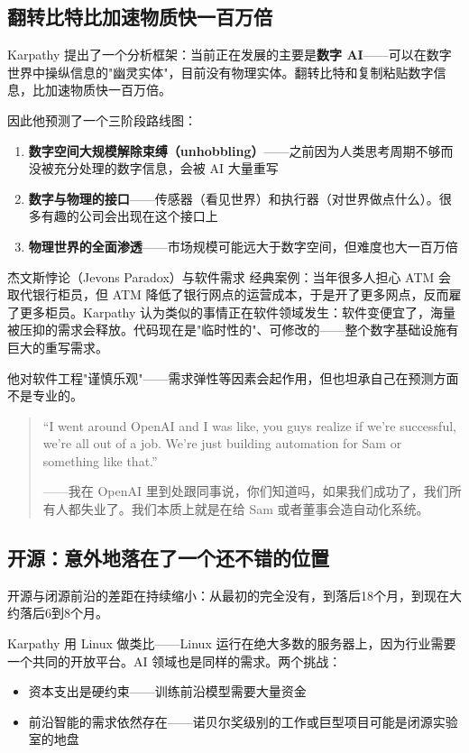 \documentclass[a4paper]{article}
\begin{document}
\subsection{翻转比特比加速物质快一百万倍}

Karpathy 提出了一个分析框架：当前正在发展的主要是\textbf{数字 AI}——可以在数字世界中操纵信息的"幽灵实体"，目前没有物理实体。翻转比特和复制粘贴数字信息，比加速物质快一百万倍。

因此他预测了一个三阶段路线图：
\begin{enumerate}
    \item \textbf{数字空间大规模解除束缚（unhobbling）}——之前因为人类思考周期不够而没被充分处理的数字信息，会被 AI 大量重写
    \item \textbf{数字与物理的接口}——传感器（看见世界）和执行器（对世界做点什么）。很多有趣的公司会出现在这个接口上
    \item \textbf{物理世界的全面渗透}——市场规模可能远大于数字空间，但难度也大一百万倍
\end{enumerate}

\begin{knowledgebox}{杰文斯悖论（Jevons Paradox）与软件需求}
经典案例：当年很多人担心 ATM 会取代银行柜员，但 ATM 降低了银行网点的运营成本，于是开了更多网点，反而雇了更多柜员。Karpathy 认为类似的事情正在软件领域发生：软件变便宜了，海量被压抑的需求会释放。代码现在是"临时性的"、可修改的——整个数字基础设施有巨大的重写需求。
\end{knowledgebox}

他对软件工程"谨慎乐观"——需求弹性等因素会起作用，但也坦承自己在预测方面不是专业的。

\begin{quote}
``I went around OpenAI and I was like, you guys realize if we're successful, we're all out of a job. We're just building automation for Sam or something like that.''

——我在 OpenAI 里到处跟同事说，你们知道吗，如果我们成功了，我们所有人都失业了。我们本质上就是在给 Sam 或者董事会造自动化系统。
\end{quote}

\subsection{开源：意外地落在了一个还不错的位置}

开源与闭源前沿的差距在持续缩小：从最初的完全没有，到落后18个月，到现在大约落后6到8个月。

Karpathy 用 Linux 做类比——Linux 运行在绝大多数的服务器上，因为行业需要一个共同的开放平台。AI 领域也是同样的需求。两个挑战：
\begin{itemize}
    \item 资本支出是硬约束——训练前沿模型需要大量资金
    \item 前沿智能的需求依然存在——诺贝尔奖级别的工作或巨型项目可能是闭源实验室的地盘
\end{itemize}
\end{document}
